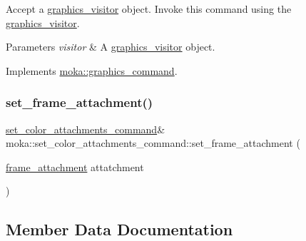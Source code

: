 Accept a \mbox{\hyperlink{classmoka_1_1graphics__visitor}{graphics\+\_\+visitor}} object. Invoke this command using the \mbox{\hyperlink{classmoka_1_1graphics__visitor}{graphics\+\_\+visitor}}. 


\begin{DoxyParams}{Parameters}
{\em visitor} & A \mbox{\hyperlink{classmoka_1_1graphics__visitor}{graphics\+\_\+visitor}} object. \\
\hline
\end{DoxyParams}


Implements \mbox{\hyperlink{classmoka_1_1graphics__command_a7affaeceb1019ab358c62185bce4e654}{moka\+::graphics\+\_\+command}}.

\mbox{\label{classmoka_1_1set__color__attachments__command_a21d82af8958888522394f5702c1dfbce}} 
\subsubsection{\texorpdfstring{set\_frame\_attachment()}{set\_frame\_attachment()}}
{\footnotesize\ttfamily \mbox{\hyperlink{classmoka_1_1set__color__attachments__command}{set\+\_\+color\+\_\+attachments\+\_\+command}}\& moka\+::set\+\_\+color\+\_\+attachments\+\_\+command\+::set\+\_\+frame\+\_\+attachment (\begin{DoxyParamCaption}\item[{\mbox{\hyperlink{namespacemoka_a0a44ecbb877dec1107d9915dc95c58d1}{frame\+\_\+attachment}}}]{attatchment }\end{DoxyParamCaption})}



\subsection{Member Data Documentation}
\mbox{\label{classmoka_1_1set__color__attachments__command_a50bb71db24d2d08a8030ea623a98f149}} 
